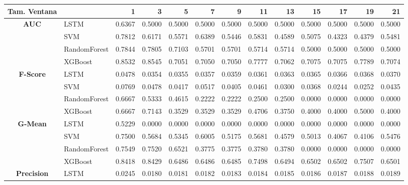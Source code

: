 \begin{table}[h]
	\centering
	\begin{adjustbox}{max width=15cm}
		\begin{tabular}{|c|l|r|r|r|r|r|r|r|r|r|r|r|}
			\hline
			\textbf{Tam. Ventana}&         &      1  &      3  &      5  &      7  &      9  &      11 &      13 &      15 &      17 &      19 &      21 \\
			\hline
			\textbf{AUC} & LSTM &  0.6367 &  0.5000 &  0.5000 &  0.5000 &  0.5000 &  0.5000 &  0.5000 &  0.5000 &  0.5000 &  0.5000 &  0.5000 \\
			& SVM &  0.7812 &  0.6171 &  0.5571 &  0.6389 &  0.5446 &  0.5831 &  0.4589 &  0.5075 &  0.4323 &  0.4379 &  0.5481 \\
			& RandomForest &  0.7844 &  0.7805 &  0.7103 &  0.5701 &  0.5701 &  0.5714 &  0.5714 &  0.5000 &  0.5000 &  0.5000 &  0.5000 \\
			& XGBoost &  0.8532 &  0.8545 &  0.7051 &  0.7050 &  0.7050 &  0.7777 &  0.7062 &  0.7075 &  0.7075 &  0.7789 &  0.7074 \\
			\hline
			\textbf{F-Score} & LSTM &  0.0478 &  0.0354 &  0.0355 &  0.0357 &  0.0359 &  0.0361 &  0.0363 &  0.0365 &  0.0366 &  0.0368 &  0.0370 \\
			& SVM &  0.0769 &  0.0478 &  0.0417 &  0.0517 &  0.0405 &  0.0461 &  0.0300 &  0.0368 &  0.0244 &  0.0252 &  0.0435 \\
			& RandomForest &  0.6667 &  0.5333 &  0.4615 &  0.2222 &  0.2222 &  0.2500 &  0.2500 &  0.0000 &  0.0000 &  0.0000 &  0.0000 \\
			& XGBoost &  0.6667 &  0.7143 &  0.3529 &  0.3529 &  0.3529 &  0.4706 &  0.3750 &  0.4000 &  0.4000 &  0.5000 &  0.4000 \\
			\hline
			\textbf{G-Mean} & LSTM &  0.5229 &  0.0000 &  0.0000 &  0.0000 &  0.0000 &  0.0000 &  0.0000 &  0.0000 &  0.0000 &  0.0000 &  0.0000 \\
			& SVM &  0.7500 &  0.5684 &  0.5345 &  0.6005 &  0.5175 &  0.5681 &  0.4579 &  0.5013 &  0.4067 &  0.4106 &  0.5476 \\
			& RandomForest &  0.7549 &  0.7520 &  0.6521 &  0.3775 &  0.3775 &  0.3780 &  0.3780 &  0.0000 &  0.0000 &  0.0000 &  0.0000 \\
			& XGBoost &  0.8418 &  0.8429 &  0.6486 &  0.6486 &  0.6485 &  0.7498 &  0.6494 &  0.6502 &  0.6502 &  0.7507 &  0.6501 \\
			\hline
			\textbf{Precision} & LSTM &  0.0245 &  0.0180 &  0.0181 &  0.0182 &  0.0183 &  0.0184 &  0.0185 &  0.0186 &  0.0187 &  0.0188 &  0.0189 \\

\end{tabular}
\end{adjustbox}
\end{table}
